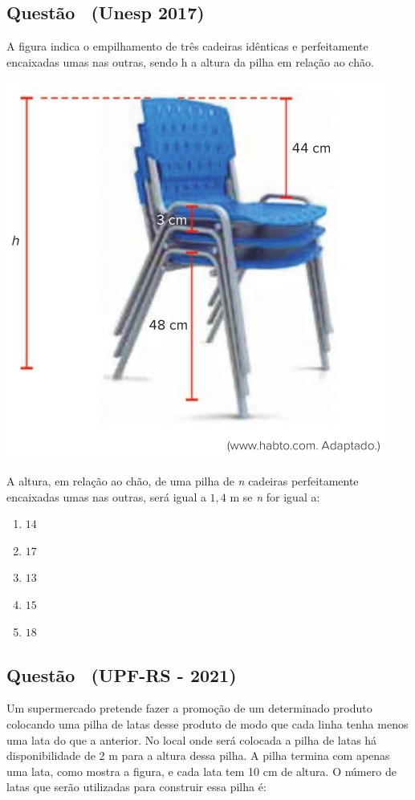 \documentclass[12pt]{article}
\newif\ifmostravermelho
\newcommand{\vermelho}[1]{%
  \ifmostravermelho
    {\color{red}#1}%
  \else
    #1%
  \fi
}
\newcounter{questao}
\newcommand{\novaquestao}[1]{%
  \stepcounter{questao}%
  \subsection*{Questão \thequestao\ (#1)}%
}
\begin{document}
\begin{multicols}{2}
        \novaquestao{Unesp 2017}
            A figura indica o empilhamento de três cadeiras idênticas e perfeitamente encaixadas umas nas outras, sendo h a altura da pilha em relação ao chão.

            \begin{center}
                \includegraphics[scale=0.5]{q35.png}
            \end{center} A altura, em relação ao chão, de uma pilha de \textit{n} cadeiras perfeitamente encaixadas umas nas outras, será igual a $1,4$ m se \textit{n} for igual a:
        
            \begin{enumerate}[label=(\alph*), noitemsep]
                \item \vermelho{$14$} %
                \item $17$ 
                \item $13$  
                \item $15$  
                \item $18$
            \end{enumerate}

        \novaquestao{UPF-RS - 2021}
            Um supermercado pretende fazer a promoção de um determinado produto colocando uma pilha de latas desse produto de modo que cada linha tenha menos uma lata do que a anterior. No local onde será colocada a pilha de latas há disponibilidade de 2 m para a altura dessa pilha. 
            A pilha termina com apenas uma lata, como mostra a figura, e cada lata tem 10 cm de altura. O número de latas que serão utilizadas para construir essa pilha é:


\end{multicols}
\end{document}
